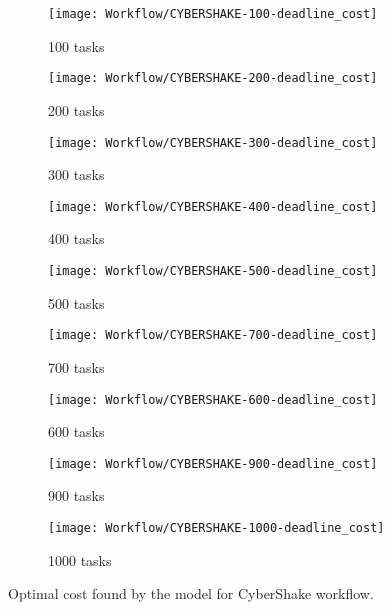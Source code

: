 {    \begin{figure}[tb] 
       \centering       
       \begin{subfigure}[b]{0.45\textwidth}
         \texttt{[image: Workflow/CYBERSHAKE-100-deadline\_cost]}
         \caption{100 tasks}
       \end{subfigure}
       \begin{subfigure}[b]{0.45\textwidth}
         \texttt{[image: Workflow/CYBERSHAKE-200-deadline\_cost]}
         \caption{200 tasks}
       \end{subfigure}
       \begin{subfigure}[b]{0.45\textwidth}
         \texttt{[image: Workflow/CYBERSHAKE-300-deadline\_cost]}
         \caption{300 tasks}
       \end{subfigure}
       \begin{subfigure}[b]{0.45\textwidth}
         \texttt{[image: Workflow/CYBERSHAKE-400-deadline\_cost]}
         \caption{400 tasks}
       \end{subfigure}
       \begin{subfigure}[b]{0.45\textwidth}
         \texttt{[image: Workflow/CYBERSHAKE-500-deadline\_cost]}
         \caption{500 tasks}
       \end{subfigure}
       \begin{subfigure}[b]{0.45\textwidth}
         \texttt{[image: Workflow/CYBERSHAKE-700-deadline\_cost]}
         \caption{700 tasks}
       \end{subfigure}
       \begin{subfigure}[b]{0.45\textwidth}
         \texttt{[image: Workflow/CYBERSHAKE-600-deadline\_cost]}
         \caption{600 tasks}
       \end{subfigure}
       \begin{subfigure}[b]{0.45\textwidth}
         \texttt{[image: Workflow/CYBERSHAKE-900-deadline\_cost]}
         \caption{900 tasks}
       \end{subfigure}
       \begin{subfigure}[b]{0.45\textwidth}
         \texttt{[image: Workflow/CYBERSHAKE-1000-deadline\_cost]}
         \caption{1000 tasks}
       \end{subfigure}
       \caption{Optimal cost found by the model for CyberShake workflow.}
       \label{fig:workflow:cybershake}
     \end{figure}
     
}
